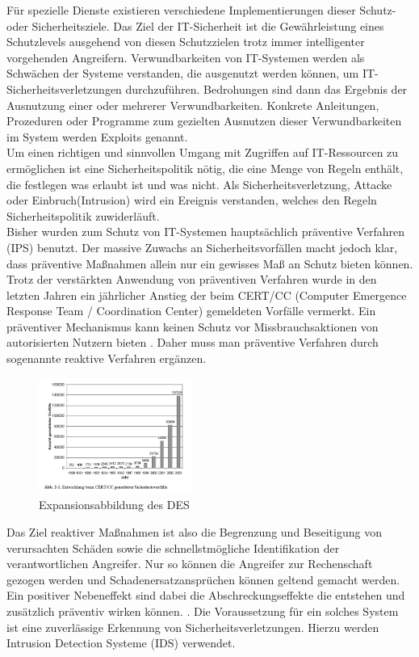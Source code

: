 \documentclass[11pt]{scrartcl}
\begin{document}
Für spezielle Dienste existieren verschiedene Implementierungen dieser
Schutz- oder Sicherheitsziele. Das Ziel der IT-Sicherheit ist die Gewährleistung eines Schutzlevels ausgehend von diesen Schutzzielen trotz  immer intelligenter vorgehenden Angreifern.
Verwundbarkeiten von IT-Systemen werden als Schwächen
der Systeme verstanden, die ausgenutzt werden können, um IT-Sicherheitsverletzungen
durchzuführen. Bedrohungen sind dann das Ergebnis der Ausnutzung einer oder mehrerer Verwundbarkeiten. Konkrete Anleitungen, Prozeduren oder Programme zum gezielten Ausnutzen dieser Verwundbarkeiten im System werden  Exploits genannt.\\
Um einen richtigen und sinnvollen Umgang mit Zugriffen auf IT-Ressourcen zu ermöglichen ist eine Sicherheitspolitik nötig, die eine Menge von Regeln enthält, die festlegen was erlaubt ist und was nicht. Als Sicherheitsverletzung, Attacke oder Einbruch(Intrusion) wird ein Ereignis verstanden, welches den Regeln Sicherheitspolitik zuwiderläuft.\\
Bisher wurden zum Schutz von IT-Systemen hauptsächlich präventive Verfahren (IPS) benutzt. Der massive Zuwachs an Sicherheitsvorfällen macht jedoch klar, dass präventive Maßnahmen allein nur ein gewisses Maß an Schutz bieten können.
Trotz der verstärkten Anwendung von präventiven Verfahren wurde in den letzten Jahren ein jährlicher Anstieg der beim CERT/CC (Computer Emergence Response
Team / Coordination Center) gemeldeten Vorfälle vermerkt. Ein präventiver Mechanismus kann keinen Schutz vor Missbrauchsaktionen von autorisierten Nutzern bieten \cite{2}. Daher muss man präventive Verfahren durch sogenannte reaktive Verfahren ergänzen.\\
\begin{figure}
\includegraphics[width=0.45\textwidth]{aa2.png}
	\caption{Expansionsabbildung des DES \cite{5}}
	\label{fig1}
\end{figure} \noindent

Das Ziel reaktiver Maßnahmen ist also die Begrenzung und Beseitigung von verursachten Schäden sowie die schnellstmögliche Identifikation der verantwortlichen Angreifer. Nur so können die Angreifer zur Rechenschaft gezogen werden und Schadenersatzansprüchen können geltend gemacht werden. Ein positiver Nebeneffekt sind dabei die Abschreckungseffekte die entstehen und zusätzlich präventiv wirken können. \cite{2}. Die Voraussetzung für ein solches System ist eine zuverlässige Erkennung von Sicherheitsverletzungen. Hierzu werden Intrusion Detection Systeme (IDS) verwendet.\cite{3}\cite{4}\cite{5}
\end{document}
